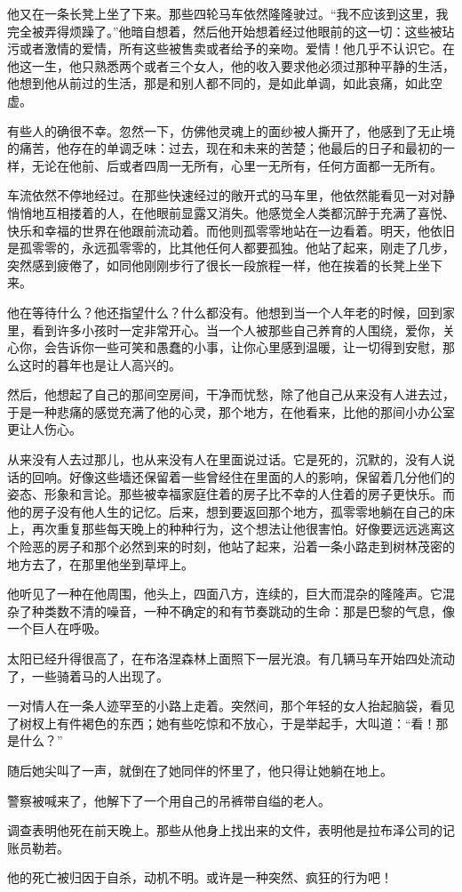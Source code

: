 \documentclass{article}
\begin{document}
他又在一条长凳上坐了下来。那些四轮马车依然隆隆驶过。“我不应该到这里，我完全被弄得烦躁了。”他暗自想着，然后他开始想着经过他眼前的这一切：这些被玷污或者激情的爱情，所有这些被售卖或者给予的亲吻。爱情！他几乎不认识它。在他这一生，他只熟悉两个或者三个女人，他的收入要求他必须过那种平静的生活，他想到他从前过的生活，那是和别人都不同的，是如此单调，如此哀痛，如此空虚。



有些人的确很不幸。忽然一下，仿佛他灵魂上的面纱被人撕开了，他感到了无止境的痛苦，他存在的单调乏味：过去，现在和未来的苦楚；他最后的日子和最初的一样，无论在他前、后或者四周一无所有，心里一无所有，任何方面都一无所有。



车流依然不停地经过。在那些快速经过的敞开式的马车里，他依然能看见一对对静悄悄地互相搂着的人，在他眼前显露又消失。他感觉全人类都沉醉于充满了喜悦、快乐和幸福的世界在他跟前流动着。而他则孤零零地站在一边看着。明天，他依旧是孤零零的，永远孤零零的，比其他任何人都要孤独。他站了起来，刚走了几步，突然感到疲倦了，如同他刚刚步行了很长一段旅程一样，他在挨着的长凳上坐下来。



他在等待什么？他还指望什么？什么都没有。他想到当一个人年老的时候，回到家里，看到许多小孩时一定非常开心。当一个人被那些自己养育的人围绕，爱你，关心你，会告诉你一些可笑和愚蠢的小事，让你心里感到温暖，让一切得到安慰，那么这时的暮年也是让人高兴的。



然后，他想起了自己的那间空房间，干净而忧愁，除了他自己从来没有人进去过，于是一种悲痛的感觉充满了他的心灵，那个地方，在他看来，比他的那间小办公室更让人伤心。



从来没有人去过那儿，也从来没有人在里面说过话。它是死的，沉默的，没有人说话的回响。好像这些墙还保留着一些曾经住在里面的人的影响，保留着几分他们的姿态、形象和言论。那些被幸福家庭住着的房子比不幸的人住着的房子更快乐。而他的房子没有他人生的记忆。后来，想到要返回那个地方，孤零零地躺在自己的床上，再次重复那些每天晚上的种种行为，这个想法让他很害怕。好像要远远逃离这个险恶的房子和那个必然到来的时刻，他站了起来，沿着一条小路走到树林茂密的地方去了，在那里他坐到草坪上。



他听见了一种在他周围，他头上，四面八方，连续的，巨大而混杂的隆隆声。它混杂了种类数不清的噪音，一种不确定的和有节奏跳动的生命：那是巴黎的气息，像一个巨人在呼吸。



太阳已经升得很高了，在布洛涅森林上面照下一层光浪。有几辆马车开始四处流动了，一些骑着马的人出现了。



一对情人在一条人迹罕至的小路上走着。突然间，那个年轻的女人抬起脑袋，看见了树杈上有件褐色的东西；她有些吃惊和不放心，于是举起手，大叫道：“看！那是什么？”



随后她尖叫了一声，就倒在了她同伴的怀里了，他只得让她躺在地上。



警察被喊来了，他解下了一个用自己的吊裤带自缢的老人。



调查表明他死在前天晚上。那些从他身上找出来的文件，表明他是拉布泽公司的记账员勒若。



他的死亡被归因于自杀，动机不明。或许是一种突然、疯狂的行为吧！
\end{document}
